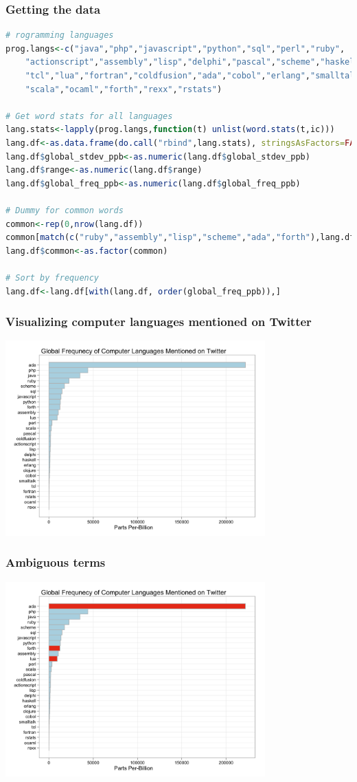 \documentclass[xcolor=dvipsnames, 9pt]{beamer}
\begin{document}
\begin{frame}[fragile]
    \frametitle{Getting the data}
    \scriptsize{\begin{lstlisting}[language=R]
# rogramming languages
prog.langs<-c("java","php","javascript","python","sql","perl","ruby",
    "actionscript","assembly","lisp","delphi","pascal","scheme","haskell",
    "tcl","lua","fortran","coldfusion","ada","cobol","erlang","smalltalk",
    "scala","ocaml","forth","rexx","rstats")
    
# Get word stats for all languages
lang.stats<-lapply(prog.langs,function(t) unlist(word.stats(t,ic)))
lang.df<-as.data.frame(do.call("rbind",lang.stats), stringsAsFactors=FALSE)
lang.df$global_stdev_ppb<-as.numeric(lang.df$global_stdev_ppb)
lang.df$range<-as.numeric(lang.df$range)
lang.df$global_freq_ppb<-as.numeric(lang.df$global_freq_ppb)

# Dummy for common words
common<-rep(0,nrow(lang.df))
common[match(c("ruby","assembly","lisp","scheme","ada","forth"),lang.df$tok)]<-1
lang.df$common<-as.factor(common)

# Sort by frequency
lang.df<-lang.df[with(lang.df, order(global_freq_ppb)),]
    \end{lstlisting}}
\end{frame}

\begin{frame}[fragile]
    \frametitle{Visualizing computer languages mentioned on Twitter}
    \includegraphics[width=10cm]{images/lang_pop1.png}
\end{frame}

\begin{frame}[fragile]
    \frametitle{Ambiguous terms}
    \includegraphics[width=10cm]{images/lang_pop2.png}
\end{frame}
\end{document}
